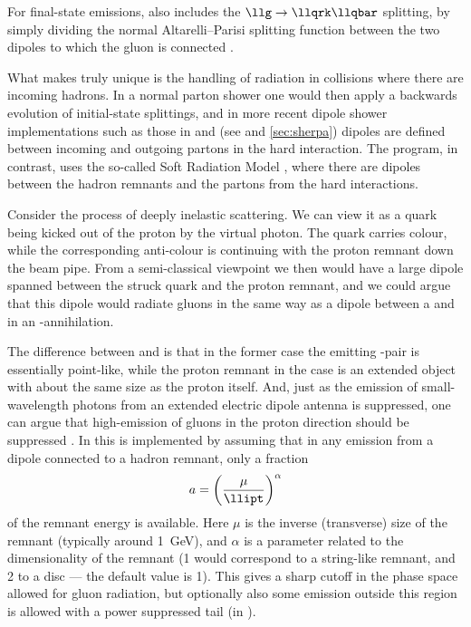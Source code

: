 For final-state emissions, \Ariadne also includes the
$\llg\to\llqrk\llqbar$ splitting, by simply dividing the normal
Altarelli--Parisi splitting function between the two dipoles to which
the gluon is connected \cite{Andersson:1989ki}.

%
What makes \Ariadne truly unique is the handling of radiation in
collisions where there are incoming hadrons. In a normal parton shower
one would then apply a backwards evolution of initial-state
splittings, and in more recent dipole shower implementations such as
those in \pythiaeight and \sherpa (see  and
\ref{sec:sherpa}) dipoles are defined between \eg incoming and
outgoing partons in the hard interaction. The \Ariadne program, in
contrast, uses the so-called Soft Radiation Model
\cite{Andersson:1988gp}, where there are dipoles between the hadron
remnants and the partons from the hard interactions.

Consider the process of deeply inelastic \llep scattering. We can view
it as a quark being kicked out of the proton by the virtual
photon. The quark carries colour, while the corresponding anti-colour
is continuing with the proton remnant down the beam pipe. From a
semi-classical viewpoint we then would have a large dipole spanned
between the struck quark and the proton remnant, and we could argue
that this dipole would radiate gluons in the same way as a dipole
between a \llqrk and \llqbar in an \llee-annihilation.

The difference between \llee and \llep is that in the former case the
emitting \llqqbar-pair is essentially point-like, while the proton
remnant in the \llep case is an extended object with about the same
size as the proton itself. And, just as the emission of
small-wavelength photons from an extended electric dipole antenna is
suppressed, one can argue that high-\llipt emission of gluons in the
proton direction should be suppressed \cite{Andersson:1988gp}. In
\Ariadne this is implemented by assuming that in any emission from a
dipole connected to a hadron remnant, only a fraction
\begin{equation}
  \label{eq:ariadne-softsup}
  a=\left(\frac{\mu}{\llipt}\right)^\alpha
\end{equation}
of the remnant energy is available. Here $\mu$ is the inverse
(transverse) size of the remnant (typically around 1~GeV), and
$\alpha$ is a parameter related to the dimensionality of the remnant
(1 would correspond to a string-like remnant, and 2 to a disc --- the
default value is 1). This gives a sharp cutoff in the phase space
allowed for gluon radiation, but optionally also some emission outside
this region is allowed with a power suppressed tail (in \llipt).

